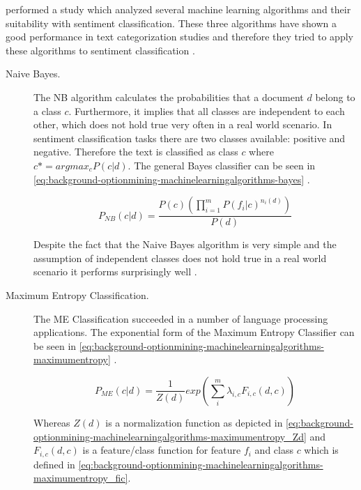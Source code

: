 \citeauthor{Pang2002} performed a study which analyzed several machine learning algorithms and their suitability with sentiment classification.
These three algorithms have shown a good performance in text categorization studies and therefore they tried to apply these algorithms to sentiment classification \cite{Pang2002}.

\begin{description}
	\item[Naive Bayes.] 
    The \ac{NB} algorithm calculates the probabilities that a document $d$ belong to a class $c$.
	Furthermore, it implies that all classes are independent to each other, which does not hold true very often in a real world scenario.
	In sentiment classification tasks there are two classes available: positive and negative.
	Therefore the text is classified as class $c$ where $c* = arg max_c P(c | d)$.
	The general Bayes classifier can be seen in \autoref{eq:background-optionmining-machinelearningalgorithms-bayes} \cite{Pang2002}.
	
	\begin{equation}
		P_{NB}(c|d) = \frac{P(c) (\prod_{i=1}^{m} P(f_i|c)^{n_i(d)}) }{P(d)}
		\label{eq:background-optionmining-machinelearningalgorithms-bayes}
	\end{equation}
	
	Despite the fact that the Naive Bayes algorithm is very simple and the assumption of independent classes does not hold true in a real world scenario it performs surprisingly well \cite{Pang2002}.
	
	\item[Maximum Entropy Classification.]
	The \ac{ME} Classification succeeded in a number of language processing applications.
	The exponential form of the Maximum Entropy Classifier can be seen in \autoref{eq:background-optionmining-machinelearningalgorithms-maximumentropy} \cite{Pang2002}.
	
	\begin{equation}
		P_{ME}(c|d) = \frac{1}{Z(d)} exp \left( \sum_i^m \lambda_{i,c}F_{i,c}(d,c) \right)
		\label{eq:background-optionmining-machinelearningalgorithms-maximumentropy}
	\end{equation}
	
	Whereas $Z(d)$ is a normalization function as depicted in \autoref{eq:background-optionmining-machinelearningalgorithms-maximumentropy_Zd} \cite{Nigam1999} and $F_{i,c}(d,c)$ is a feature/class function for feature $f_i$ and class $c$ which is defined in \autoref{eq:background-optionmining-machinelearningalgorithms-maximumentropy_fic}.


\end{description}
